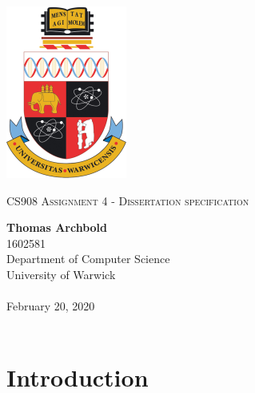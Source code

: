 \documentclass[10pt,a4paper]{article}
\theoremstyle{plain}
\theoremstyle{definition}
\begin{document}
\begin{titlepage}
    \begin{center}

        \vspace*{2cm}
        \includegraphics[width=.25\textwidth]{crest.png}

        \vspace*{1cm}
		{\Large \textsc{CS908 Assignment 4 - Dissertation specification}}

        \vspace*{1cm}
        \textbf{Thomas Archbold} \\
        1602581 \\
        Department of Computer Science \\
        University of Warwick \\~\\

        February 20, 2020 \\~\\

        \vfill

    \end{center}
\end{titlepage}



\section{Introduction}
\end{document}

